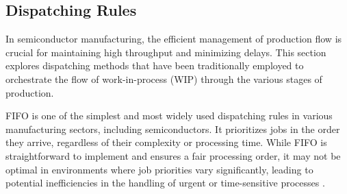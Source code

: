 



\subsection{Dispatching Rules}

In semiconductor manufacturing, the efficient management of production flow is crucial for maintaining high throughput and minimizing delays. This section explores dispatching methods that have been traditionally employed to orchestrate the flow of work-in-process (WIP) through the various stages of production. 

FIFO is one of the simplest and most widely used dispatching rules in various manufacturing sectors, including semiconductors. It prioritizes jobs in the order they arrive, regardless of their complexity or processing time. While FIFO is straightforward to implement and ensures a fair processing order, it may not be optimal in environments where job priorities vary significantly, leading to potential inefficiencies in the handling of urgent or time-sensitive processes \cite{kumar1993}.

